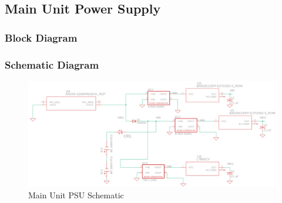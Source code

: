 \subsection{Main Unit Power Supply}
\subsubsection{Block Diagram}
\subsubsection{Schematic Diagram}
\begin{landscape}
  \begin{center}
  \begin{figure}[H]
    \includegraphics[width=1.6\textwidth, left]{../Modular Design/Main-Unit-PSU/Figures/main-unit-psu.png}
    \caption{Main Unit PSU Schematic}
    \label{fig:main-psu-schematic}
  \end{figure}
  \end{center}
\end{landscape}
